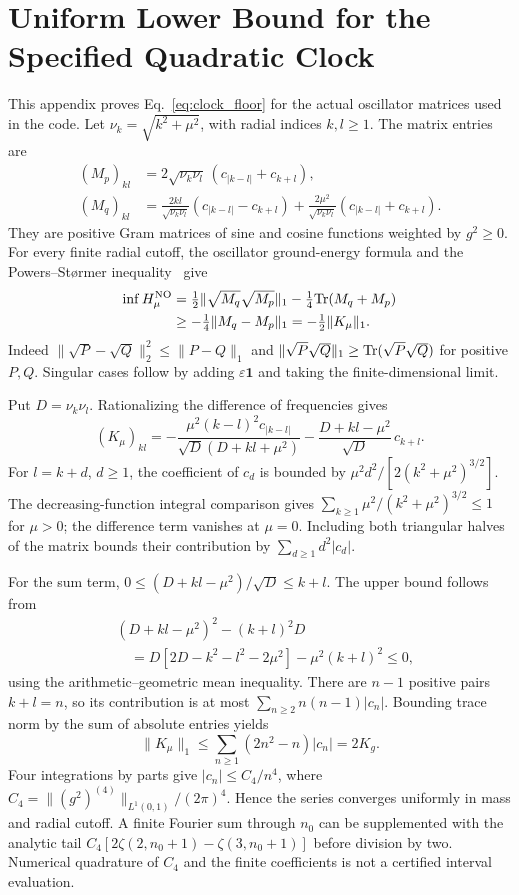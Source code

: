 \section{Uniform Lower Bound for the Specified Quadratic Clock}\label{app:clock_proof}

This appendix proves Eq.~\eqref{eq:clock_floor} for the actual oscillator matrices used in the code. Let $\nu_k=\sqrt{k^2+\mu^2}$, with radial indices $k,l\ge1$. The matrix entries are
\begin{align}
(M_p)_{kl}&=2\sqrt{\nu_k\nu_l}\,(c_{|k-l|}+c_{k+l}),\nonumber\\
(M_q)_{kl}&=\frac{2kl}{\sqrt{\nu_k\nu_l}}(c_{|k-l|}-c_{k+l})
+\frac{2\mu^2}{\sqrt{\nu_k\nu_l}}(c_{|k-l|}+c_{k+l}).
\end{align}
They are positive Gram matrices of sine and cosine functions weighted by $g^2\ge0$. For every finite radial cutoff, the oscillator ground-energy formula and the Powers--St\o rmer inequality~\cite{PowersStormer1970} give
\begin{align}
\inf H_\mu^{\mathrm{NO}}
&=\tfrac12\|\sqrt{M_q}\sqrt{M_p}\|_1-\tfrac14\mathrm{Tr}(M_q+M_p)\nonumber\\
&\ge-\tfrac14\|M_q-M_p\|_1=-\tfrac12\|K_\mu\|_1.
\end{align}
Indeed $\|\sqrt P-\sqrt Q\|_2^2\le\|P-Q\|_1$ and $\|\sqrt P\sqrt Q\|_1\ge\mathrm{Tr}(\sqrt P\sqrt Q)$ for positive $P,Q$. Singular cases follow by adding $\varepsilon\mathbf1$ and taking the finite-dimensional limit.

Put $D=\nu_k\nu_l$. Rationalizing the difference of frequencies gives
\begin{equation}\label{eq:stable_pair_kernel}
(K_\mu)_{kl}=-\frac{\mu^2(k-l)^2c_{|k-l|}}{\sqrt D(D+kl+\mu^2)}
-\frac{D+kl-\mu^2}{\sqrt D}\,c_{k+l}.
\end{equation}
For $l=k+d$, $d\ge1$, the coefficient of $c_d$ is bounded by
$\mu^2d^2/[2(k^2+\mu^2)^{3/2}]$.
The decreasing-function integral comparison gives
$\sum_{k\ge1}\mu^2/(k^2+\mu^2)^{3/2}\le1$ for $\mu>0$; the difference term vanishes at $\mu=0$. Including both triangular halves of the matrix bounds their contribution by $\sum_{d\ge1}d^2|c_d|$.

For the sum term, $0\le(D+kl-\mu^2)/\sqrt D\le k+l$. The upper bound follows from
\begin{align}
&(D+kl-\mu^2)^2-(k+l)^2D\nonumber\\
&\quad=D[2D-k^2-l^2-2\mu^2]-\mu^2(k+l)^2\le0,
\end{align}
using the arithmetic--geometric mean inequality. There are $n-1$ positive pairs $k+l=n$, so its contribution is at most $\sum_{n\ge2}n(n-1)|c_n|$. Bounding trace norm by the sum of absolute entries yields
\begin{equation}
\|K_\mu\|_1\le\sum_{n\ge1}(2n^2-n)|c_n|=2K_g.
\end{equation}
Four integrations by parts give $|c_n|\le C_4/n^4$, where $C_4=\|(g^2)^{(4)}\|_{L^1(0,1)}/(2\pi)^4$. Hence the series converges uniformly in mass and radial cutoff. A finite Fourier sum through $n_0$ can be supplemented with the analytic tail
$C_4[2\zeta(2,n_0+1)-\zeta(3,n_0+1)]$ before division by two. Numerical quadrature of $C_4$ and the finite coefficients is not a certified interval evaluation.

